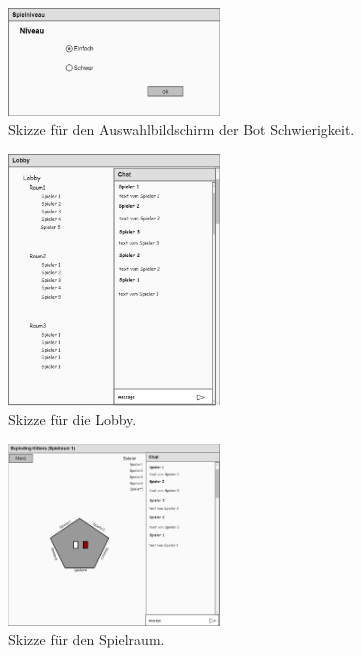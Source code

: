 \begin{figure}
	\centering
	\includegraphics[width=0.5\textwidth]{img/Niveau}
	\caption{Skizze für den Auswahlbildschirm der Bot Schwierigkeit.}
	\label{gui:niveau}
\end{figure}

\begin{figure}
	\centering
	\includegraphics[width=0.5\textwidth]{img/Lobby}
	\caption{Skizze für die Lobby.}
	\label{gui:lobby}
\end{figure}

\begin{figure}
	\centering
	\includegraphics[width=0.5\textwidth]{img/Spielraum}
	\caption{Skizze für den Spielraum.}
	\label{gui:raum}
\end{figure}
